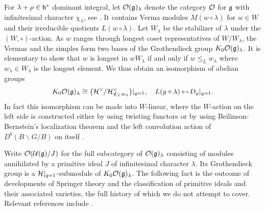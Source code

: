 \documentclass[reqno]{amsart}
\begin{document}
For $\lambda + \rho \in \mathfrak{h}^*$ dominant integral, let $\mathcal{O}(\mathfrak{g})_\lambda$ denote the category $\mathcal{O}$ for $\mathfrak{g}$ with infinitesimal character $\chi_\lambda$, see \cite{Humphreys:Cat-O}. It contains Verma modules $M(w \circ \lambda)$ for $w \in W$ and their irreducible quotients $L(w \circ \lambda)$. Let $W_\lambda$ be the stabilizer of $\lambda$ under the $(W,\circ)$-action. As $w$ ranges through longest coset representatives of $W/W_\lambda$, the Vermas and the simples form two bases of the Grothendieck group $K_0 \mathcal{O}(\mathfrak{g})_\lambda$. It is elementary to show that $w$ is longest in $w W_\lambda$ if and only if $w \le_L w_\lambda$ where $w_\lambda \in W_\lambda$ is the longest element. We thus obtain an isomorphism of abelian groups
\begin{equation}\label{eqn:O-Hecke}
	K_0 \cO(\fg)_\lambda \cong \big( \cH^\vee / \cH_{\not\le_L w_\lambda}^\vee \big)|_{q=1},\quad
	L(y \circ \lambda) \mathop{\mapsfrom} D_y|_{q=1}.
\end{equation}
In fact this isomorphism can be made into $W$-linear, where the $W$-action on the left side is constructed either by using twisting functors \cite{Andersen-Stroppel:twisting} or by using Beilinson-Bernstein's localization theorem and the left convolution action of $D^b(B \backslash G/B)$ on itself \cite[Chapter 12-13]{HTT}.

Write $\mathcal{O}(\mathcal{U}(\mathfrak{g})/J)$ for the full subcategory of $\mathcal{O}(\mathfrak{g})_\lambda$ consisting of modules annihilated by a primitive ideal $J$ of infinitesimal character $\lambda$. Its Grothendieck group is a $\mathcal{H}|_{q=1}$-submodule of $K_0 \mathcal{O}(\mathfrak{g})_\lambda$. The following fact is the outcome of developments of Springer theory and the classification of primitive ideals and their associated varieties, the full history of which we do not attempt to cover. Relevant references include \cite{Joseph:W-mod-prim,Joseph:prim,Vogan:ordering,Lusztig:char,Barbasch-Vogan:unipotent,KL:Hecke,Beilinson-Bernstein:localization,Brylinski-Kashiwara}.
\end{document}
